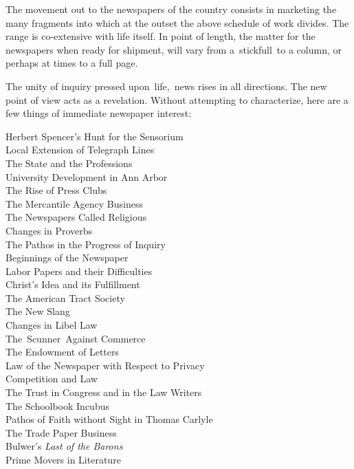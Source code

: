 \documentclass[openany,nobib]{tufte-book}
\begin{document}
The movement out to the newspapers of the country consists in marketing
the many fragments into which at the outset the above schedule of work
divides. The range is co-extensive with life itself. In point of length,
the matter for the newspapers when ready for shipment, will vary from
a~stickfull~to a column, or perhaps at times to a full page.~

The unity of inquiry pressed upon~life,~news rises in all directions.
The new point of view acts as a revelation. Without attempting to
characterize, here are a few things of immediate newspaper interest:~

\vspace{.1in}

    


Herbert Spencer's Hunt for the Sensorium~\\
Local Extension of Telegraph Lines~\\
The State and the Professions ~\\
University Development in Ann Arbor~\\
The Rise of Press Clubs~\\
The Mercantile Agency Business~\\
The Newspapers Called Religious~\\
Changes in Proverbs~\\
The Pathos in the Progress of Inquiry~\\
Beginnings of the Newspaper~\\
Labor Papers and their Difficulties~\\
Christ's Idea and its Fulfillment~\\
The American Tract Society~\\
The New Slang~\\
Changes in Libel Law~\\
The~Scunner~Against Commerce~\\
The Endowment of Letters~\\
Law of the Newspaper with Respect to Privacy~\\
Competition and Law~\\
The Trust in Congress and in the Law Writers~\\
The Schoolbook Incubus~\\
Pathos of Faith without Sight in Thomas Carlyle~\\
The Trade Paper Business~\\
Bulwer's \emph{Last of the Barons}~\\
Prime Movers in Literature~\\
\end{document}
